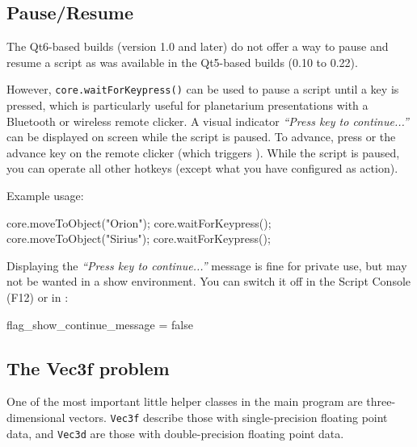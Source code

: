 \subsection{Pause/Resume}
\label{sec:scripting:differences:pause}

The Qt6-based builds (version 1.0 and later) do not offer a way to pause and resume a script as was available in the Qt5-based builds (0.10 to 0.22). 

However, \texttt{core.waitForKeypress()} can be used to pause a script until a key is pressed, 
which is particularly useful for planetarium presentations with a Bluetooth or wireless remote clicker. 
A visual indicator \emph{``Press key to continue...''} can be displayed on screen while the script is paused.
To advance, press   or the advance key on the remote clicker (which triggers ).
While the script is paused, you can operate all other hotkeys (except what you have configured as  action).  

Example usage:
\begin{script}
core.moveToObject("Orion");
core.waitForKeypress();
core.moveToObject("Sirius");
core.waitForKeypress();
\end{script}

Displaying the \emph{``Press key to continue...''} message is fine for private use, but may not be wanted in a show environment. 
You can switch it off in the Script Console (F12) or in :

\begin{configfile}
[scripts]
flag_show_continue_message = false
\end{configfile}


\subsection{The Vec3f problem}
\label{sec:scripting:differences:Vec3f}

One of the most important little helper classes in the main program are three-dimensional vectors. 
\texttt{Vec3f} describe those with single-precision floating point data, 
and \texttt{Vec3d} are those with double-precision floating point data.

